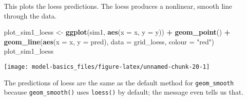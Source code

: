 \documentclass[]{book}
\newenvironment{Shaded}{\begin{snugshade}}{\end{snugshade}}
\newcommand{\DataTypeTok}[1]{\textcolor[rgb]{0.13,0.29,0.53}{#1}}
\newcommand{\KeywordTok}[1]{\textcolor[rgb]{0.13,0.29,0.53}{\textbf{#1}}}
\newcommand{\NormalTok}[1]{#1}
\newcommand{\OperatorTok}[1]{\textcolor[rgb]{0.81,0.36,0.00}{\textbf{#1}}}
\newcommand{\StringTok}[1]{\textcolor[rgb]{0.31,0.60,0.02}{#1}}
\theoremstyle{definition}
\theoremstyle{definition}
\theoremstyle{definition}
\theoremstyle{remark}
\begin{document}
\begin{Shaded}
\end{Shaded}

This plots the loess predictions. The loess produces a nonlinear, smooth
line through the data.

\begin{Shaded}
\begin{Highlighting}[]
\NormalTok{plot_sim1_loess <-}\StringTok{ }
\StringTok{  }\KeywordTok{ggplot}\NormalTok{(sim1, }\KeywordTok{aes}\NormalTok{(}\DataTypeTok{x =}\NormalTok{ x, }\DataTypeTok{y =}\NormalTok{ y)) }\OperatorTok{+}
\StringTok{  }\KeywordTok{geom_point}\NormalTok{() }\OperatorTok{+}
\StringTok{  }\KeywordTok{geom_line}\NormalTok{(}\KeywordTok{aes}\NormalTok{(}\DataTypeTok{x =}\NormalTok{ x, }\DataTypeTok{y =}\NormalTok{ pred), }\DataTypeTok{data =}\NormalTok{ grid_loess, }\DataTypeTok{colour =} \StringTok{"red"}\NormalTok{)}
\NormalTok{plot_sim1_loess}
\end{Highlighting}
\end{Shaded}

\begin{center}\texttt{[image: model-basics\_files/figure-latex/unnamed-chunk-20-1]} \end{center}

The predictions of loess are the same as the default method for
\texttt{geom\_smooth} because \texttt{geom\_smooth()} uses
\texttt{loess()} by default; the message even tells us that.
\end{document}
